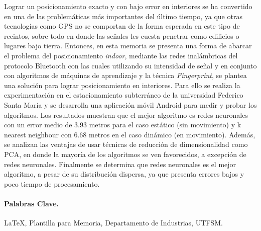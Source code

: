 
Lograr un posicionamiento exacto y con bajo error en interiores se ha convertido en una de las problemáticas más importantes del último tiempo, ya que otras tecnologías como GPS no se comportan de la forma esperada en este tipo de recintos, sobre todo en donde las señales les cuesta penetrar como edificios o lugares bajo tierra. Entonces, en esta memoria se presenta una forma de abarcar el problema del posicionamiento \textit{indoor}, mediante las redes inalámbricas del protocolo Bluetooth con las cuales utilizando su intensidad de señal y en conjunto con algoritmos de máquinas de aprendizaje y la técnica \textit{Fingerprint}, se plantea una solución para lograr posicionamiento en interiores. Para ello se realiza la experimentación en el estacionamiento subterráneo de la universidad Federico Santa María y se desarrolla una aplicación móvil Android para medir y probar los algoritmos. Los resultados muestran que el mejor algoritmo es redes neuronales con un error medio de 3.93 metros para el caso estático (sin movimiento) y k nearest neighbour con 6.68 metros en el caso dinámico (en movimiento). Además, se analizan las ventajas de usar técnicas de reducción de dimensionalidad como PCA, en donde la mayoría de los algoritmos se ven favorecidos, a excepción de redes neuronales. Finalmente se determina que redes neuronales es el mejor algoritmo, a pesar de su distribución dispersa, ya que presenta errores bajos y poco tiempo de procesamiento.

\vspace{20mm}

\paragraph{Palabras Clave.}
\LaTeX{}, Plantilla para Memoria, Departamento de Industrias, UTFSM.

